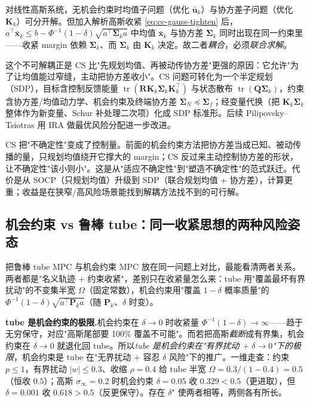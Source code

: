\begin{theorem}[有机会约束时均值与协方差不可解耦]\label{thm:cc-cs-coupling}
对线性高斯系统，无机会约束时均值子问题（优化 $\bar{\mathbf{u}}_k$）与协方差子问题（优化 $\mathbf{K}_k$）可分开解。但加入解析高斯收紧 \cref{eq:cc-gauss-tighten} 后，$a^\top\bar{\mathbf{x}}_k\le b-\Phi^{-1}(1-\delta)\sqrt{a^\top\boldsymbol{\Sigma}_k a}$ 中均值 $\bar{\mathbf{x}}_k$ 与协方差 $\boldsymbol{\Sigma}_k$ 同时出现在同一约束里——收紧 margin 依赖 $\boldsymbol{\Sigma}_k$、而 $\boldsymbol{\Sigma}_k$ 由 $\mathbf{K}_k$ 决定。故二者\emph{耦合}，必须\emph{联合求解}。
\end{theorem}

这个不可解耦正是 CS 比"先规划均值、再被动传协方差"更强的原因：它允许"为了让均值能过窄缝，主动把协方差收小"。CS 问题可转化为一个半定规划（SDP），目标含控制反馈能量 $\operatorname{tr}(\mathbf{R}\mathbf{K}_k\boldsymbol{\Sigma}_k\mathbf{K}_k^\top)$ 与状态散布 $\operatorname{tr}(\mathbf{Q}\boldsymbol{\Sigma}_k)$，约束含协方差/均值动力学、机会约束及终端协方差 $\boldsymbol{\Sigma}_N\preceq\boldsymbol{\Sigma}_f$；经变量代换（把 $\mathbf{K}_k\boldsymbol{\Sigma}_k$ 整体作为新变量、Schur 补处理二次项）化成 SDP 标准形\cite{okamoto2018optimal}。后续 Pilipovsky--Tsiotras 用 IRA 做最优风险分配进一步改进。

\begin{insight}
CS 把"不确定性"变成了控制量。前面的机会约束方法把协方差当成已知、被动传播的量，只规划均值绕开它撑大的 margin；CS 反过来主动控制协方差的形状，让不确定性"该小则小"。这是从"适应不确定性"到"塑造不确定性"的范式跃迁。代价是从 SOCP（只规划均值）升级到 SDP（联合规划均值 + 协方差），计算更重；收益是在狭窄/高风险场景能找到解耦方法找不到的可行解。
\end{insight}

\subsection{机会约束 vs 鲁棒 tube：同一收紧思想的两种风险姿态}
\label{sec:cc-vs-tube}

把鲁棒 tube MPC 与机会约束 MPC 放在同一问题上对比，最能看清两者关系。两者都是"名义轨迹 + 约束收紧"，差别只在收紧量怎么来：tube 用"覆盖最坏有界扰动"的不变集半宽 $\Omega$（固定常数），机会约束用"覆盖 $1-\delta$ 概率质量"的 $\Phi^{-1}(1-\delta)\sqrt{a^\top\mathbf{P}_k a}$（随 $\mathbf{P}_k$、$\delta$ 时变）。

\begin{note}
\textbf{tube 是机会约束的极限.}\;机会约束在 $\delta\to0$ 时收紧量 $\Phi^{-1}(1-\delta)\to\infty$——趋于无穷保守，对应"高斯尾部要 100\% 覆盖不可能"。而若把高斯\emph{截断}成有界集，机会约束在 $\delta\to0$ 就退化回 tube。所以\emph{tube 是机会约束在"有界扰动 + $\delta\to0$"下的极限}，机会约束是 tube 在"无界扰动 + 容忍 $\delta$ 风险"下的推广。一维走查：约束 $p\le1$，有界扰动 $|w|\le0.3$、收缩 $\rho=0.4$ 给 tube 半宽 $\Omega=0.3/(1-0.4)=0.5$（恒收 $0.5$）；高斯 $\sigma_\infty=0.2$ 时机会约束 $\delta=0.05$ 收 $0.329<0.5$（更进取），但 $\delta=0.001$ 收 $0.618>0.5$（反更保守）。存在 $\delta^\star$ 使两者相等，两侧各有所长。
\end{note}

